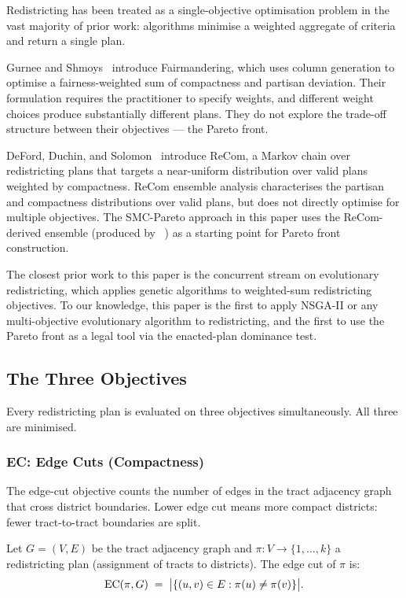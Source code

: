 Redistricting has been treated as a single-objective optimisation problem in
the vast majority of prior work: algorithms minimise a weighted aggregate of
criteria and return a single plan.

Gurnee and Shmoys~\citeyear{gurnee2021} introduce Fairmandering, which uses
column generation to optimise a fairness-weighted sum of compactness and
partisan deviation.
Their formulation requires the practitioner to specify weights, and different
weight choices produce substantially different plans.
They do not explore the trade-off structure between their objectives --- the
Pareto front.

DeFord, Duchin, and Solomon~\citeyear{deford2021} introduce ReCom, a Markov
chain over redistricting plans that targets a near-uniform distribution over
valid plans weighted by compactness.
ReCom ensemble analysis characterises the partisan and compactness distributions
over valid plans, but does not directly optimise for multiple objectives.
The SMC-Pareto approach in this paper uses the ReCom-derived ensemble
(produced by \smc{}~\citep{dellaLibera2026smc}) as a starting point for
Pareto front construction.

The closest prior work to this paper is the concurrent stream on
evolutionary redistricting, which applies genetic algorithms to weighted-sum
redistricting objectives.
To our knowledge, this paper is the first to apply NSGA-II or any
multi-objective evolutionary algorithm to redistricting, and the first to
use the Pareto front as a legal tool via the enacted-plan dominance test.

\subsection{The Three Objectives}

Every redistricting plan is evaluated on three objectives simultaneously.
All three are minimised.

\subsubsection{EC: Edge Cuts (Compactness)}

The edge-cut objective counts the number of edges in the tract adjacency
graph that cross district boundaries.
Lower edge cut means more compact districts: fewer tract-to-tract boundaries
are split.

\begin{definition}
\label{def:ec}
Let $G = (V, E)$ be the tract adjacency graph and $\pi : V \to \{1,\ldots,k\}$
a redistricting plan (assignment of tracts to districts).
The edge cut of $\pi$ is:
\[
  \mathrm{EC}(\pi, G) \;=\; \bigl|\{(u,v) \in E : \pi(u) \neq \pi(v)\}\bigr|.
\]
\end{definition}


